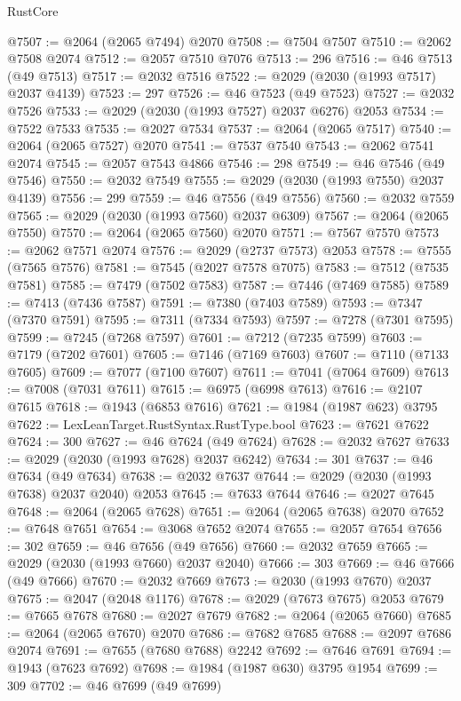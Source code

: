 \begin{lexlean}{RustCore}
\begin{coremodule}
@7507 := @2064 (@2065 @7494) @2070
@7508 := @7504 @7507
@7510 := @2062 @7508 @2074
@7512 := @2057 @7510 @7076
@7513 := 296
@7516 := @46 @7513 (@49 @7513)
@7517 := @2032 @7516
@7522 := @2029 (@2030 (@1993 @7517) @2037 @4139)
@7523 := 297
@7526 := @46 @7523 (@49 @7523)
@7527 := @2032 @7526
@7533 := @2029 (@2030 (@1993 @7527) @2037 @6276) @2053
@7534 := @7522 @7533
@7535 := @2027 @7534
@7537 := @2064 (@2065 @7517)
@7540 := @2064 (@2065 @7527) @2070
@7541 := @7537 @7540
@7543 := @2062 @7541 @2074
@7545 := @2057 @7543 @4866
@7546 := 298
@7549 := @46 @7546 (@49 @7546)
@7550 := @2032 @7549
@7555 := @2029 (@2030 (@1993 @7550) @2037 @4139)
@7556 := 299
@7559 := @46 @7556 (@49 @7556)
@7560 := @2032 @7559
@7565 := @2029 (@2030 (@1993 @7560) @2037 @6309)
@7567 := @2064 (@2065 @7550)
@7570 := @2064 (@2065 @7560) @2070
@7571 := @7567 @7570
@7573 := @2062 @7571 @2074
@7576 := @2029 (@2737 @7573) @2053
@7578 := @7555 (@7565 @7576)
@7581 := @7545 (@2027 @7578 @7075)
@7583 := @7512 (@7535 @7581)
@7585 := @7479 (@7502 @7583)
@7587 := @7446 (@7469 @7585)
@7589 := @7413 (@7436 @7587)
@7591 := @7380 (@7403 @7589)
@7593 := @7347 (@7370 @7591)
@7595 := @7311 (@7334 @7593)
@7597 := @7278 (@7301 @7595)
@7599 := @7245 (@7268 @7597)
@7601 := @7212 (@7235 @7599)
@7603 := @7179 (@7202 @7601)
@7605 := @7146 (@7169 @7603)
@7607 := @7110 (@7133 @7605)
@7609 := @7077 (@7100 @7607)
@7611 := @7041 (@7064 @7609)
@7613 := @7008 (@7031 @7611)
@7615 := @6975 (@6998 @7613)
@7616 := @2107 @7615
@7618 := @1943 (@6853 @7616)
@7621 := @1984 (@1987 @623) @3795
@7622 := LexLeanTarget.RustSyntax.RustType.bool
@7623 := @7621 @7622
@7624 := 300
@7627 := @46 @7624 (@49 @7624)
@7628 := @2032 @7627
@7633 := @2029 (@2030 (@1993 @7628) @2037 @6242)
@7634 := 301
@7637 := @46 @7634 (@49 @7634)
@7638 := @2032 @7637
@7644 := @2029 (@2030 (@1993 @7638) @2037 @2040) @2053
@7645 := @7633 @7644
@7646 := @2027 @7645
@7648 := @2064 (@2065 @7628)
@7651 := @2064 (@2065 @7638) @2070
@7652 := @7648 @7651
@7654 := @3068 @7652 @2074
@7655 := @2057 @7654
@7656 := 302
@7659 := @46 @7656 (@49 @7656)
@7660 := @2032 @7659
@7665 := @2029 (@2030 (@1993 @7660) @2037 @2040)
@7666 := 303
@7669 := @46 @7666 (@49 @7666)
@7670 := @2032 @7669
@7673 := @2030 (@1993 @7670) @2037
@7675 := @2047 (@2048 @1176)
@7678 := @2029 (@7673 @7675) @2053
@7679 := @7665 @7678
@7680 := @2027 @7679
@7682 := @2064 (@2065 @7660)
@7685 := @2064 (@2065 @7670) @2070
@7686 := @7682 @7685
@7688 := @2097 @7686 @2074
@7691 := @7655 (@7680 @7688) @2242
@7692 := @7646 @7691
@7694 := @1943 (@7623 @7692)
@7698 := @1984 (@1987 @630) @3795 @1954
@7699 := 309
@7702 := @46 @7699 (@49 @7699)

\end{coremodule}
\end{lexlean}
